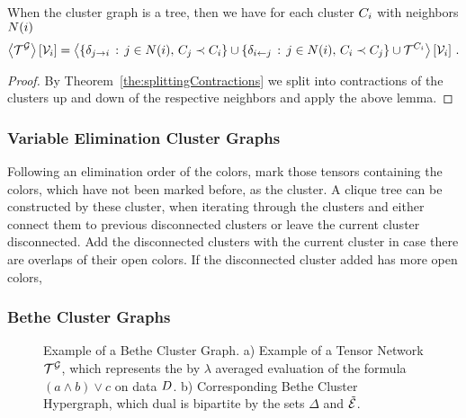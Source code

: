 \begin{theorem}
	When the cluster graph is a tree, then we have for each cluster $C_{i}$ with neighbors $N(i)$
	\begin{align}
		\left\langle \mathcal{T}^{\mathcal{G}}\right\rangle \left[ \mathcal{V}_i \right] = 
		\left\langle 
			\{ \delta_{j \rightarrow i}  \, : \, j \in N(i) , \, C_{j}\prec C_{i} \}  \cup 
			\{ \delta_{i \leftarrow j}  \, : \, j \in N(i),  \, C_{i}\prec C_{j} \} \cup \mathcal{T}^{C_{i}}
		\right\rangle \left[ \mathcal{V}_i \right] \, .
	\end{align}
\end{theorem}
\begin{proof}
	By Theorem~\ref{the:splittingContractions} we split into contractions of the clusters up and down of the respective neighbors and apply the above lemma.
\end{proof}





\subsubsection{Variable Elimination Cluster Graphs}


\begin{remark}
	Following an elimination order of the colors, mark those tensors containing the colors, which have not been marked before, as the cluster.
	A clique tree can be constructed by these cluster, when iterating through the clusters and either connect them to previous disconnected clusters or leave the current cluster disconnected.
	Add the disconnected clusters with the current cluster in case there are overlaps of their open colors.
	If the disconnected cluster added has more open colors, 
\end{remark}


\subsubsection{Bethe Cluster Graphs}


\begin{figure}[h]
\begin{center}
	
\end{center}
\caption{Example of a Bethe Cluster Graph.
	a) Example of a Tensor Network $\mathcal{T}^{\mathcal{G}}$, which represents the by $\lambda$ averaged evaluation of the formula $(a\land b)\lor c$ on data $D$.
	b) Corresponding Bethe Cluster Hypergraph, which dual is bipartite by the sets $\Delta$ and $\tilde{\mathcal{E}}$.
	}
\label{fig:betheDataExample} 
\end{figure}

